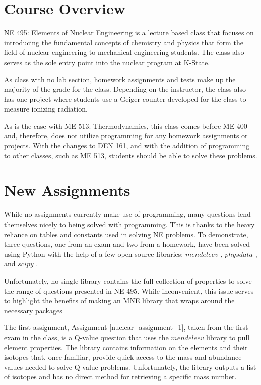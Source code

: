 \section{Course Overview}

NE 495: Elements of Nuclear Engineering is a lecture based class that focuses on introducing
the fundamental concepts of chemistry and physics that form the field of nuclear engineering 
to mechanical engineering students. The class also serves as the sole entry point into the nuclear
program at K-State. 

As class with no lab section, homework assignments and tests make up the majority of the grade
for the class. Depending on the instructor, the class also has one project where students use a 
Geiger counter developed for the class to measure ionizing radiation.

As is the case with ME 513: Thermodynamics, this class comes before ME 400 and, therefore, does
not utilize programming for any homework assignments or projects. With the changes to DEN 161,
and with the addition of programming to other classes, such as ME 513, students should be able 
to solve these problems.

\section{New Assignments}

While no assignments currently make use of programming, many questions lend themselves nicely
to being solved with programming. This is thanks to the heavy reliance on tables and
constants used in solving NE problems. To demonstrate, three questions, one from an exam
and two from a homework, have been solved using Python with the help of a few open source
libraries: $mendeleev$ \cite{Mentel_mendeleev_-_A_2021}, $physdata$ \cite{physdata2016}, and $scipy$
\cite{2020SciPy-NMeth}.

Unfortunately, no single library contains the full collection of properties to solve the range
of questions presented in NE 495. While inconvenient, this issue serves to highlight the
benefits of making an MNE library that wraps around the necessary packages

The first assignment, Assignment \ref{nuclear_assignment_1}, taken from the first exam in the class, 
is a Q-value question that uses 
the $mendeleev$ library to pull element properties. The library contains information on the elements
and their isotopes that, once familiar, provide quick access to the mass and abundance values
needed to solve Q-value problems. Unfortunately, the library outputs a list of isotopes and 
has no direct method for retrieving a specific mass number.

